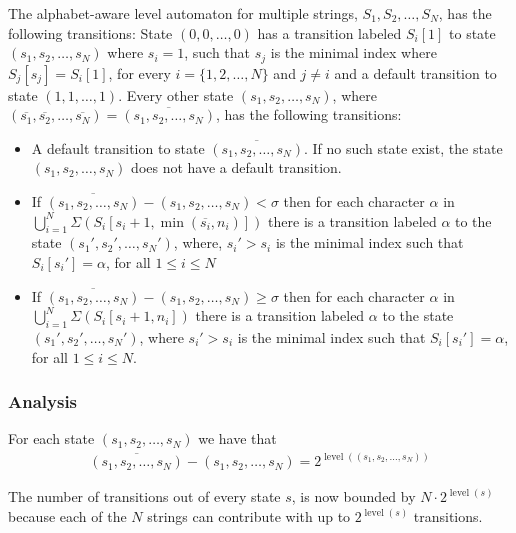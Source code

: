 \documentclass[a4paper,11pt]{article}
\DeclareMathOperator{\level}{level}
\begin{document}
The alphabet-aware level automaton for multiple strings, $S_1,S_2,\ldots, S_N$, has the following transitions: State $(0,0,\ldots,0)$ has a transition labeled $S_i[1]$ to state $(s_1, s_2, \ldots,s_N)$ where $s_i=1$, such that $s_j$ is the minimal index where $S_j[s_j]=S_i[1]$, for every $i=\{1,2, \ldots, N\}$ and $j\not = i$ and a default transition to state $(1,1, \ldots, 1)$.
Every other state $(s_1,s_2, \ldots, s_N)$, where $(\overline{s_1}, \overline{s_2}, \ldots, \overline{s_N})= \overline{(s_1,s_2, \ldots, s_N)}$, has the following transitions:
\begin{itemize}
\item A default transition to state $\overline{(s_1,s_2, \ldots, s_N)}$. If no such state exist, the state $(s_1,s_2, \ldots, s_N)$ does not have a default transition.
\item If $\overline{(s_1,s_2, \ldots, s_N)} - (s_1,s_2, \ldots, s_N) < \sigma$ then for each character $\alpha$ in $\bigcup_{i=1}^N \Sigma(S_i[s_i + 1, \min(\overline{s_i},  n_i )])$  there is a transition labeled $\alpha$ to the state $(s_1',s_2', \ldots, s_N')$, where, $s_i'>s_i$ is the minimal index such that $S_i[s_i']= \alpha$, for all $1\leq i \leq N$
\item If $\overline{(s_1,s_2, \ldots, s_N)} - (s_1,s_2, \ldots, s_N) \geq \sigma$ then for each character $\alpha$ in $\bigcup_{i=1}^N \Sigma(S_i[s_i + 1,  n_i ])$ there is a transition labeled $\alpha$ to the state $(s_1',s_2', \ldots, s_N')$, where $s_i'>s_i$ is the minimal index such that $S_i[s_i'] = \alpha$, for all $1\leq i \leq N$.
\end{itemize}

\subsubsection{Analysis}
For each state $(s_1, s_2, \ldots, s_N)$ we have that 
\begin{gather*}
\overline{(s_1, s_2, \ldots, s_N)} - (s_1, s_2, \ldots, s_N) = 2^{\level((s_1, s_2, \ldots, s_N))}
\end{gather*}

The number of transitions out of every state $s$, is now bounded by $N\cdot 2^{\level(s)}$ because each of the $N$ strings can contribute with up to $2^{\level(s)}$ transitions.
\end{document}
